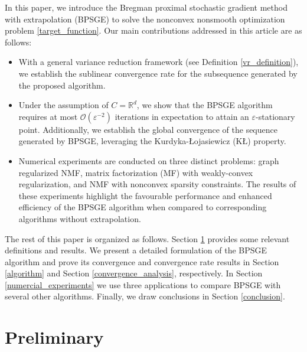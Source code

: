 \documentclass[letterpaper]{article} %
\begin{document}
	In this paper, we introduce the Bregman proximal stochastic gradient method with extrapolation (BPSGE) to solve the nonconvex nonsmooth optimization problem \eqref{target_function}. Our main contributions addressed in this article are as follows:
	\begin{itemize}
		\item With a general variance reduction framework (see Definition \ref{vr_definition}), we establish the sublinear convergence rate for the subsequence %
		generated by the proposed algorithm.
		\item Under the assumption of $C=\mathbb{R}^{d}$, we show that the BPSGE algorithm  requires at most $\mathcal{O}(\varepsilon^{-2})$ iterations in expectation to attain an $\varepsilon$-stationary point. Additionally, we establish the global convergence of the {sequence} generated by   BPSGE, leveraging the Kurdyka-{\L}ojasiewicz (K{\L}) property.
		\item Numerical experiments are conducted on three distinct problems: graph regularized NMF, matrix factorization (MF) with weakly-convex regularization, and  NMF with nonconvex sparsity constraints. The results of these experiments highlight the favourable performance and enhanced efficiency of the BPSGE algorithm when compared to corresponding algorithms without extrapolation.
	\end{itemize}

	The rest of this paper is organized as follows. Section \ref{preliminary} provides some relevant deﬁnitions and results. We present a detailed formulation of the BPSGE algorithm and prove its convergence and convergence rate results in Section \ref{algorithm} and Section \ref{convergence_analysis}, respectively. In Section \ref{numercial_experiments} we use three applications to compare BPSGE with several other algorithms. Finally, we draw conclusions in Section \ref{conclusion}.


	\section{Preliminary}\label{preliminary}
\end{document}
